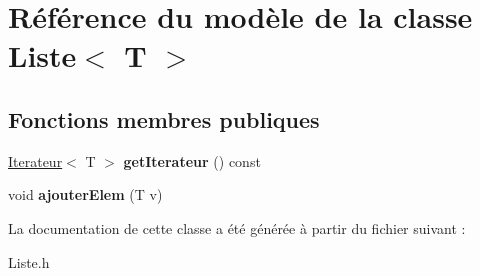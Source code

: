 \hypertarget{class_liste}{}\section{Référence du modèle de la classe Liste$<$ T $>$}
\label{class_liste}
\subsection*{Fonctions membres publiques}
\begin{DoxyCompactItemize}
\item 
\mbox{\label{class_liste_a83c5eb9c99b1af1e7efc55220d6a5ad0}} 
\mbox{\hyperlink{class_iterateur}{Iterateur}}$<$ T $>$ {\bfseries get\+Iterateur} () const
\item 
\mbox{\label{class_liste_a3c9c3d497a93d7e81286f6dc55eb11a4}} 
void {\bfseries ajouter\+Elem} (T v)
\end{DoxyCompactItemize}


La documentation de cette classe a été générée à partir du fichier suivant \+:\begin{DoxyCompactItemize}
\item 
Liste.\+h\end{DoxyCompactItemize}
